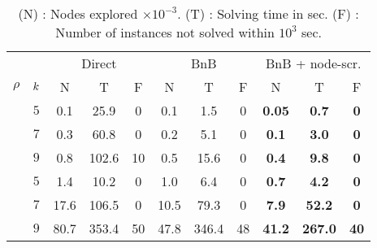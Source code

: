 \setlength{\tabcolsep}{11pt}

\begin{table}[!ht]
	\small
	\centering
    \begin{tabular}{cc||c|c|c||c|c|c||c|c|c}
	\toprule
	& & \multicolumn{3}{c||}{Direct} & \multicolumn{3}{c||}{BnB} & \multicolumn{3}{c}{BnB + node-scr.} \\
	$\rho$ & \(k\) & \multicolumn{1}{c}{N} & \multicolumn{1}{c}{T} & \multicolumn{1}{c||}{F} & \multicolumn{1}{c}{N} & \multicolumn{1}{c}{T} & \multicolumn{1}{c||}{F} & \multicolumn{1}{c}{N} & \multicolumn{1}{c}{T} & \multicolumn{1}{c}{F} \\ \midrule\midrule
    & \(5\) & 0.1 & 25.9 & 0 & 0.1 & 1.5 & 0 & \textbf{0.05} & \textbf{0.7} & \textbf{0} \\
    & \(7\) & 0.3 & 60.8 & 0 & 0.2 & 5.1 & 0 & \textbf{0.1} & \textbf{3.0} & \textbf{0} \\ 
    \parbox[t]{8mm}{} & \(9\) & 0.8 & 102.6 & 10 & 0.5 & 15.6 & 0 & \textbf{0.4} & \textbf{9.8} & \textbf{0} \\ \midrule
	& \(5\) & 1.4 & 10.2 & 0 & 1.0 & 6.4 & 0 & \textbf{0.7} & \textbf{4.2} & \textbf{0} \\
    & \(7\) & 17.6 & 106.5 & 0 & 10.5 & 79.3 & 0 & \textbf{7.9} & \textbf{52.2} & \textbf{0} \\ 
    \parbox[t]{8mm}{} & \(9\) & 80.7 & 353.4 & 50 & 47.8 & 346.4 & 48 & \textbf{41.2} & \textbf{267.0} & \textbf{40} \\ \bottomrule                      
    \end{tabular}
	\caption{
		\small
		\label{tab:figure}
		(N) : Nodes explored $\times10^{-3}$. (T) : Solving time in sec. (F) : Number of instances not solved within $10^3$ sec.
	}
\end{table}
